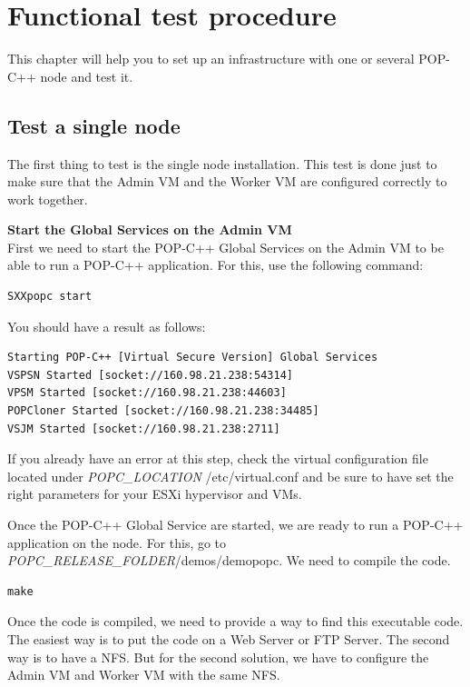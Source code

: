 \section{Functional test procedure}
This chapter will help you to set up an infrastructure with one or several POP-C++ node and test it. 


\subsection{Test a single node}
The first thing to test is the single node installation. This test is done just to make sure that the Admin VM and the Worker VM are configured correctly to work together. \s

\textbf{Start the Global Services on the Admin VM}\\
First we need to start the POP-C++ Global Services on the Admin VM to be able to run a POP-C++ application. For this, use the following command:\s

\begin{lstlisting}
SXXpopc start
\end{lstlisting}\s

You should have a result as follows: \s

\begin{lstlisting}
Starting POP-C++ [Virtual Secure Version] Global Services
VSPSN Started [socket://160.98.21.238:54314] 
VPSM Started [socket://160.98.21.238:44603] 
POPCloner Started [socket://160.98.21.238:34485] 
VSJM Started [socket://160.98.21.238:2711] 
\end{lstlisting}\s

If you already have an error at this step, check the virtual configuration file located under \textit{POPC\_LOCATION} /etc/virtual.conf and be sure to have set the right parameters for your ESXi hypervisor and VMs.\s

Once the POP-C++ Global Service are started, we are ready to run a POP-C++ application on the node. For this, go to \textit{POPC\_RELEASE\_FOLDER}/demos/demopopc. We need to compile the code.\s

\begin{lstlisting}
make
\end{lstlisting}\s

Once the code is compiled, we need to provide a way to find this executable code. The easiest way is to put the code on a Web Server or FTP Server. The second way is to have a NFS. But for the second solution, we have to configure the Admin VM and Worker VM with the same NFS.\s

